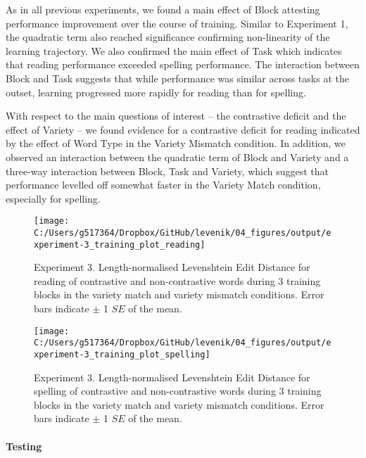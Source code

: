 \documentclass[doc,floatsintext]{apa6}
\let\oldparagraph\paragraph
\renewcommand{\paragraph}[1]{\oldparagraph{#1}\mbox{}}
\begin{document}
As in all previous experiments, we found a main effect of Block
attesting performance improvement over the course of training. Similar
to Experiment 1, the quadratic term also reached significance confirming
non-linearity of the learning trajectory. We also confirmed the main
effect of Task which indicates that reading performance exceeded
spelling performance. The interaction between Block and Task suggests
that while performance was similar across tasks at the outset, learning
progressed more rapidly for reading than for spelling.

With respect to the main questions of interest -- the contrastive
deficit and the effect of Variety -- we found evidence for a contrastive
deficit for reading indicated by the effect of Word Type in the Variety
Mismatch condition. In addition, we observed an interaction between the
quadratic term of Block and Variety and a three-way interaction between
Block, Task and Variety, which suggest that performance levelled off
somewhat faster in the Variety Match condition, especially for spelling.

\begin{figure}[htb]

{\centering \texttt{[image: C:/Users/g517364/Dropbox/GitHub/levenik/04\_figures/output/experiment-3\_training\_plot\_reading]} 

}

\caption{Experiment 3. Length-normalised Levenshtein Edit Distance for reading of contrastive and non-contrastive words during 3 training blocks in the variety match and variety mismatch conditions. Error bars indicate $\pm$ 1 $SE$ of the mean.}\label{fig:ex3-train-reading-plots}
\end{figure}

\begin{figure}[htb]

{\centering \texttt{[image: C:/Users/g517364/Dropbox/GitHub/levenik/04\_figures/output/experiment-3\_training\_plot\_spelling]} 

}

\caption{Experiment 3. Length-normalised Levenshtein Edit Distance for spelling of contrastive and non-contrastive words during 3 training blocks in the variety match and variety mismatch conditions. Error bars indicate $\pm$ 1 $SE$ of the mean.}\label{fig:ex3-train-spelling-plots}
\end{figure}

\paragraph{Testing}\label{testing-3}
\end{document}
